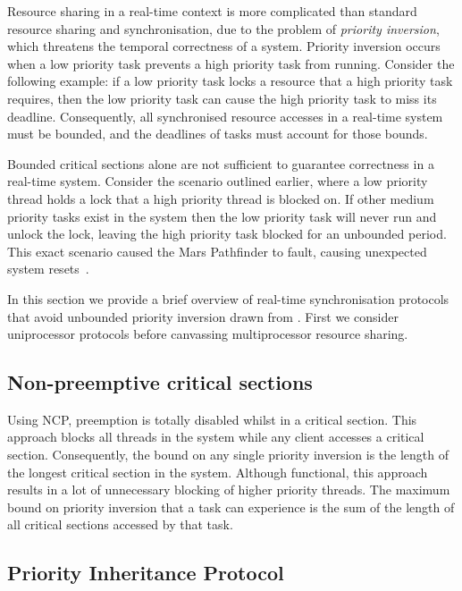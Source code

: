 Resource sharing in a real-time context is more complicated than standard resource sharing and
synchronisation, due to the problem of \emph{priority inversion}, which threatens the temporal
correctness of a system.  Priority inversion occurs when a low priority task prevents a high
priority task from running.  Consider the following example: if a low priority task locks a resource
that a high priority task requires, then the low priority task can cause the high priority task to
miss its deadline.  Consequently, all synchronised resource accesses in a real-time system must be
bounded, and the deadlines of tasks must account for those bounds.

Bounded critical sections alone are not sufficient to guarantee correctness in a real-time
system. Consider the scenario outlined earlier, where a low priority thread holds a lock that a high
priority thread is blocked on.  If other medium priority tasks exist in the system then the low
priority task will never run and unlock the lock, leaving the high priority task blocked for an
unbounded period.  This exact scenario caused the Mars Pathfinder to fault, causing unexpected
system resets~\citep{Mars_Pathfinder}.

In this section we provide a brief overview of real-time synchronisation protocols that
avoid unbounded priority inversion drawn from \citet{Sha_RL_90}. First we consider uniprocessor
protocols before canvassing multiprocessor resource sharing.

\subsection{Non-preemptive critical sections}

Using \gls{NCP}, preemption is totally disabled whilst in a critical section.  This approach blocks
all threads in the system while any client accesses a critical section.  Consequently, the bound on
any single priority inversion is the length of the longest critical section in the system.  Although
functional, this approach results in a lot of unnecessary blocking of higher priority threads.  The
maximum bound on priority inversion that a task can experience is the sum of the length of all
critical sections accessed by that task. 

\subsection{Priority Inheritance Protocol}
\label{sec:pip}

